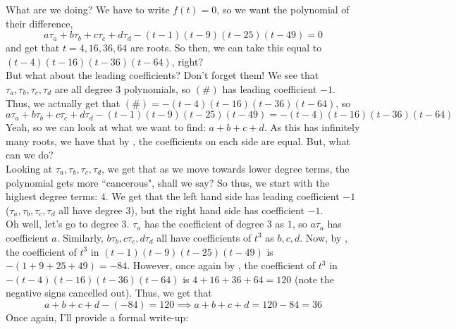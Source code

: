 \documentclass[11pt,titlepage]{scrartcl}
\begin{document}
What are we doing? We have to write $f(t)=0$, so we want the polynomial of their difference,
\[a\tau_a+b\tau_b+c\tau_c+d\tau_d-(t-1)(t-9)(t-25)(t-49)=0\tag{\#}\]
and get that $t=4,16,36,64$ are roots. So then, we can take this equal to $(t-4)(t-16)(t-36)(t-64)$, right?\\[2\baselineskip]
But what about the leading coefficients? Don't forget them! We see that $\tau_a,\tau_b,\tau_c,\tau_d$ are all degree 3 polynomials, so $(\#)$ has leading coefficient $-1$. Thus, we actually get that $(\#)=-(t-4)(t-16)(t-36)(t-64)$, so 
\[a\tau_a+b\tau_b+c\tau_c+d\tau_d-(t-1)(t-9)(t-25)(t-49)=-(t-4)(t-16)(t-36)(t-64)\]
Yeah, so we can look at what we want to find: $a+b+c+d$. As this has infinitely many roots, we have that by , the coefficients on each side are equal. But, what can we do?\\[2\baselineskip]
Looking at $\tau_a,\tau_b,\tau_c,\tau_d$, we get that as we move towards lower degree terms, the polynomial gets more ``cancerous", shall we say? So thus, we start with the highest degree terms: $4$. We get that the left hand side has leading coefficient $-1$ ($\tau_a,\tau_b,\tau_c,\tau_d$ all have degree 3), but the right hand side has coefficient $-1$. \\[2\baselineskip]
Oh well, let's go to degree $3$. $\tau_a$ has the coefficient of degree $3$ as $1$, so $a\tau_a$ has coefficient $a$. Similarly, $b\tau_b,c\tau_c,d\tau_d$ all have coefficients of $t^3$ as $b,c,d$. Now, by , the coefficient of $t^3$ in $(t-1)(t-9)(t-25)(t-49)$ is $-(1+9+25+49)=-84$. However, once again by , the coefficient of $t^3$ in $-(t-4)(t-16)(t-36)(t-64)$ is $4+16+36+64=120$ (note the negative signs cancelled out). Thus, we get that
\[a+b+c+d-(-84)=120\implies a+b+c+d=120-84=\boxed{36}\]
Once again, I'll provide a formal write-up:
\end{document}
